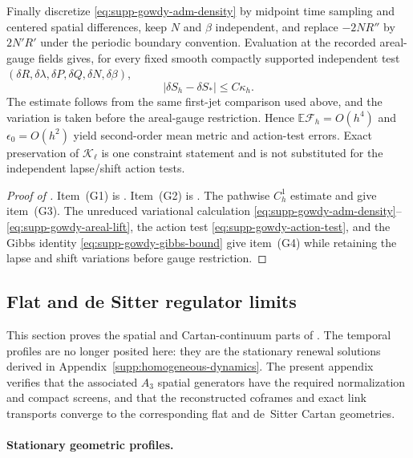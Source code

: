 \documentclass[11pt]{article}
\numberwithin{equation}{section}
\theoremstyle{definition}
\theoremstyle{remark}
\begin{document}
Finally discretize \eqref{eq:supp-gowdy-adm-density} by midpoint time sampling
and centered spatial differences, keep $N$ and $\beta$ independent, and replace
$-2NR''$ by $2N'R'$ under the periodic boundary convention.  Evaluation at the
recorded areal-gauge fields gives, for every fixed smooth compactly supported
independent test $(\delta R,\delta\lambda,\delta P,\delta Q,\delta N,\delta\beta)$,
\begin{equation}
 |\delta S_h-\delta S_*|\le C\kappa_h.
 \label{eq:supp-gowdy-action-test}
\end{equation}
The estimate follows from the same first-jet comparison used above, and the
variation is taken before the areal-gauge restriction.  Hence
$\mathbb E\mathcal F_h=O(h^4)$ and $\epsilon_0=O(h^2)$ yield second-order mean
metric and action-test errors.  Exact preservation of
$\mathcal K_\ell$ is one constraint statement and is not substituted for the
independent lapse/shift action tests.

\begin{proof}[Proof of ]
Item~\textup{(G1)} is .  Item~\textup{(G2)} is
.  The pathwise $C_h^1$ estimate and
 give item~\textup{(G3)}.  The unreduced
variational calculation
\eqref{eq:supp-gowdy-adm-density}--\eqref{eq:supp-gowdy-areal-lift}, the action
test \eqref{eq:supp-gowdy-action-test}, and the Gibbs identity
\eqref{eq:supp-gowdy-gibbs-bound} give item~\textup{(G4)} while retaining the
lapse and shift variations before gauge restriction.
\end{proof}

\subsection{Flat and de Sitter regulator limits}
\label{supp:vacuum}

This section proves the spatial and Cartan-continuum parts of
.  The temporal profiles are no longer posited here: they are
the stationary renewal solutions derived in
Appendix~\ref{supp:homogeneous-dynamics}.  The present appendix verifies that
the associated $A_3$ spatial generators have the required normalization and
compact screens, and that the reconstructed coframes and exact link transports
converge to the corresponding flat and de~Sitter Cartan geometries.

\paragraph{Stationary geometric profiles.}
\end{document}
